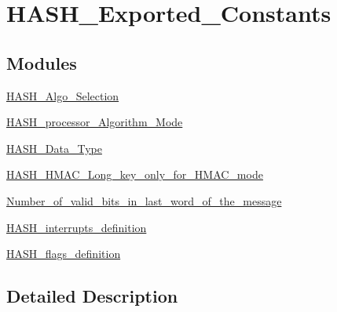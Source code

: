 \hypertarget{group___h_a_s_h___exported___constants}{\section{H\-A\-S\-H\-\_\-\-Exported\-\_\-\-Constants}
\label{group___h_a_s_h___exported___constants}
}
\subsection*{Modules}
\begin{DoxyCompactItemize}
\item 
\hyperlink{group___h_a_s_h___algo___selection}{H\-A\-S\-H\-\_\-\-Algo\-\_\-\-Selection}
\item 
\hyperlink{group___h_a_s_h__processor___algorithm___mode}{H\-A\-S\-H\-\_\-processor\-\_\-\-Algorithm\-\_\-\-Mode}
\item 
\hyperlink{group___h_a_s_h___data___type}{H\-A\-S\-H\-\_\-\-Data\-\_\-\-Type}
\item 
\hyperlink{group___h_a_s_h___h_m_a_c___long__key__only__for___h_m_a_c__mode}{H\-A\-S\-H\-\_\-\-H\-M\-A\-C\-\_\-\-Long\-\_\-key\-\_\-only\-\_\-for\-\_\-\-H\-M\-A\-C\-\_\-mode}
\item 
\hyperlink{group___number__of__valid__bits__in__last__word__of__the__message}{Number\-\_\-of\-\_\-valid\-\_\-bits\-\_\-in\-\_\-last\-\_\-word\-\_\-of\-\_\-the\-\_\-message}
\item 
\hyperlink{group___h_a_s_h__interrupts__definition}{H\-A\-S\-H\-\_\-interrupts\-\_\-definition}
\item 
\hyperlink{group___h_a_s_h__flags__definition}{H\-A\-S\-H\-\_\-flags\-\_\-definition}
\end{DoxyCompactItemize}


\subsection{Detailed Description}
